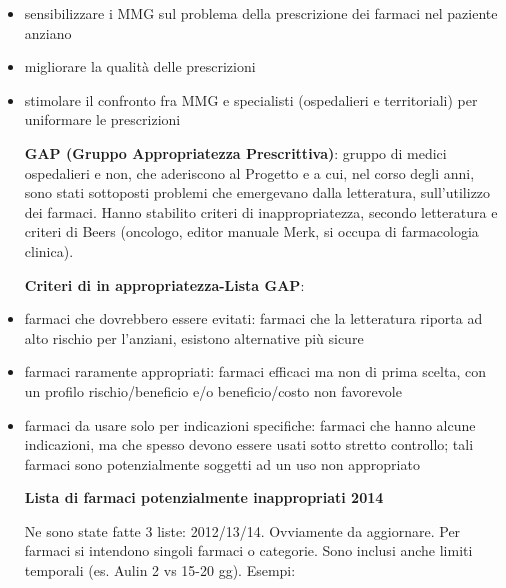 \documentclass[]{article}
\begin{document}
\begin{itemize}
\item
  sensibilizzare i MMG sul problema della prescrizione dei farmaci nel
  paziente anziano
\item
  migliorare la qualità delle prescrizioni
\item
  stimolare il confronto fra MMG e specialisti (ospedalieri e
  territoriali) per uniformare le prescrizioni

  \textbf{GAP (Gruppo Appropriatezza Prescrittiva)}: gruppo di medici
  ospedalieri e non, che aderiscono al Progetto e a cui, nel corso degli
  anni, sono stati sottoposti problemi che emergevano dalla letteratura,
  sull'utilizzo dei farmaci. Hanno stabilito criteri di
  inappropriatezza, secondo letteratura e criteri di Beers (oncologo,
  editor manuale Merk, si occupa di farmacologia clinica).

  \textbf{Criteri di in appropriatezza-Lista GAP}:
\end{itemize}

\begin{itemize}
\item
  farmaci che dovrebbero essere evitati: farmaci che la letteratura
  riporta ad alto rischio per l'anziani, esistono alternative più sicure
\item
  farmaci raramente appropriati: farmaci efficaci ma non di prima
  scelta, con un profilo rischio/beneficio e/o beneficio/costo non
  favorevole
\item
  farmaci da usare solo per indicazioni specifiche: farmaci che hanno
  alcune indicazioni, ma che spesso devono essere usati sotto stretto
  controllo; tali farmaci sono potenzialmente soggetti ad un uso non
  appropriato

  \textbf{Lista di farmaci potenzialmente inappropriati 2014}

  Ne sono state fatte 3 liste: 2012/13/14. Ovviamente da aggiornare. Per
  farmaci si intendono singoli farmaci o categorie. Sono inclusi anche
  limiti temporali (es. Aulin 2 vs 15-20 gg). Esempi:
\end{itemize}
\end{document}
